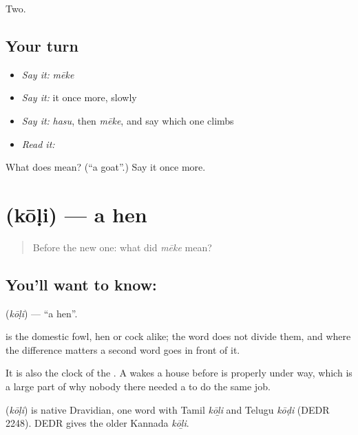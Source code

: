 \begin{grammarlens}[title={What you've built}]
Two.
\end{grammarlens}

\subsection*{Your turn}
\begin{itemize}
\raggedright
  \item \emph{Say it:} \emph{mēke}
  \item \emph{Say it:} it once more, slowly
  \item \emph{Say it:} \emph{hasu}, then \emph{mēke}, and say which one climbs
  \item \emph{Read it:} \textbf{}
\end{itemize}

\begin{tcolorbox}[breakable,colback=teal!4,colframe=teal!35!black,title={Before you move on}]
What does  mean? (\textquotedblleft{}a goat\textquotedblright{}.) Say it once more.
\end{tcolorbox}
\section[\texorpdfstring{\kn{ಕೋಳಿ} (kōḷi)}{ಕೋಳಿ (kōḷi)}]{ (kōḷi) — a hen}

\label{lesson:KA-C60-hen}



\begin{quote}
Before the new one: what did \emph{mēke} mean?
\end{quote}

\subsection*{You'll want to know: }
\textbf{} (\emph{kōḷi}) — \textquotedblleft{}a hen\textquotedblright{}.

 is the domestic fowl, hen or cock alike; the word does not divide them, and where the difference matters a second word goes in front of it.

It is also the clock of the . A  wakes a house before  is properly under way, which is a large part of why nobody there needed a  to do the same job.

\begin{cousinweb}
\textbf{} (\emph{kōḷi}) is native Dravidian, one word with Tamil \emph{kōḻi} and Telugu \emph{kōḍi} (DEDR 2248). DEDR gives the older Kannada \emph{kōḻi}.
\end{cousinweb}

